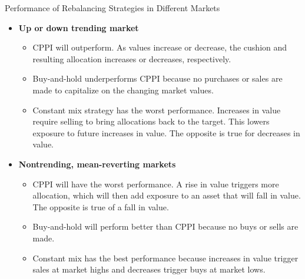 \documentclass[../custom]{flashcards}
\begin{document}
\begin{flashcard}[\studyArea]{Performance of Rebalancing Strategies in Different Markets}
    \begin{itemize}
        \item \textbf{Up or down trending market}
            \begin{itemize}
                \item CPPI will outperform. As values increase or decrease, the cushion and resulting allocation increases or decreases, respectively.
                \item Buy-and-hold underperforms CPPI because no purchases or sales are made to capitalize on the changing market values.
                \item Constant mix strategy has the worst performance. Increases in value require selling to bring allocations back to the target. This lowers exposure to future increases in value. The opposite is true for decreases in value.
            \end{itemize}
        \item \textbf{Nontrending, mean-reverting markets}
            \begin{itemize}
                \item CPPI will have the worst performance. A rise in value triggers more allocation, which will then add exposure to an asset that will fall in value. The opposite is true of a fall in value.
                \item Buy-and-hold will perform better than CPPI because no buys or sells are made.
                \item Constant mix has the best performance because increases in value trigger sales at market highs and decreases trigger buys at market lows.
            \end{itemize}
    \end{itemize}
\end{flashcard}

\renewcommand{\studyArea}{Evaluating Portfolio Performance}
\end{document}
